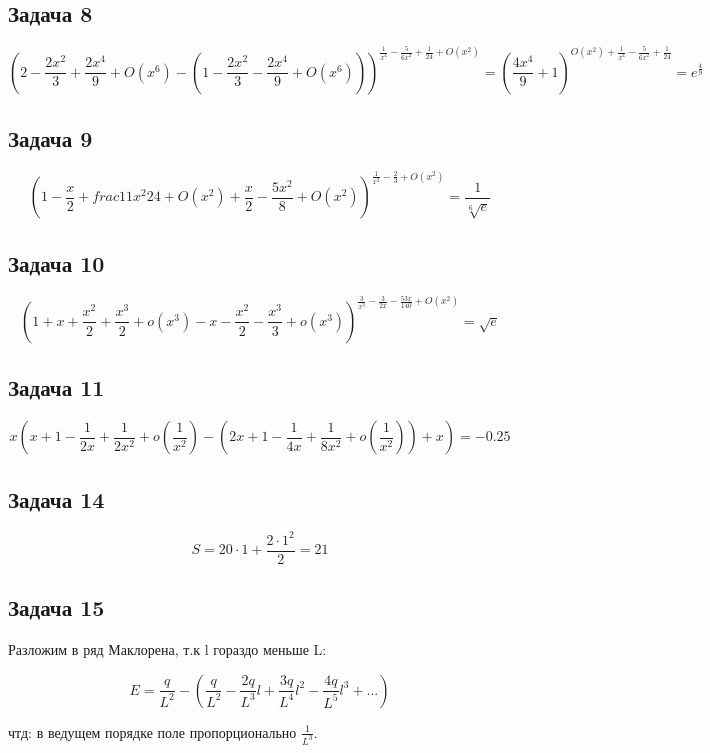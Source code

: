 \documentclass[a4paper,12pt]{article}
\begin{document}
\subsection{Задача 8}
\[
(2-\frac{2x^2}{3}+\frac{2x^4}{9}+O(x^6)-(1-\frac{2x^2}{3}-\frac{2x^4}{9}+O(x^6)))^{\frac{1}{x^4}-\frac{5}{6x^2}+\frac{1}{24}+O(x^2)} = (\frac{4x^4}{9}+1)^{O(x^2)+\frac{1}{x^4}-\frac{5}{6x^2}+\frac{1}{24}}=e^{\frac{4}{9}}
\]

\subsection{Задача 9}
\[
(1-\frac{x}{2}+frac{11x^2}{24}+O(x^2)+\frac{x}{2}-\frac{5x^2}{8}+O(x^2))^{\frac{1}{x^2}-\frac{2}{3}+O(x^2)} = \frac{1}{\sqrt[6]{e}}
\]

\subsection{Задача 10}
\[
(1+x+\frac{x^2}{2}+\frac{x^3}{2}+o(x^3)-x-\frac{x^2}{2}-\frac{x^3}{3}+o(x^3))^{\frac{3}{x^3}-\frac{3}{2x}-\frac{53x}{140}+O(x^2)} = \sqrt{e}
\]

\subsection{Задача 11}

\[
x(x+1-\frac{1}{2x}+\frac{1}{2x^2}+o(\frac{1}{x^2})-(2x+1-\frac{1}{4x}+\frac{1}{8x^2}+o(\frac{1}{x^2}))+x)=-0.25
\]

\subsection{Задача 14}

\[
S = 20\cdot 1 + \frac{2\cdot 1^2}{2} = 21
\]

\subsection{Задача 15}
Разложим в ряд Маклорена, т.к l гораздо меньше L:

\[
E = \frac{q}{L^2} - (\frac{q}{L^2} - \frac{2q}{L^3}l + \frac{3q}{L^4}l^2 - \frac{4q}{L^5}l^3 + ...)
\]

чтд: в ведущем порядке поле пропорционально $\frac{1}{L^3}$.
\end{document}
